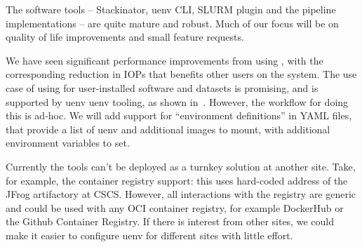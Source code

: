 The software tools -- Stackinator, uenv CLI, SLURM plugin and the pipeline implementations -- are quite mature and robust.
Much of our focus will be on quality of life improvements and small feature requests.

We have seen significant performance improvements from using \squashfs, with the corresponding reduction in IOPs that benefits other users on the system.
The use case of using \squashfs for user-installed software and datasets is promising, and is supported by uenv uenv tooling, as shown in~.
However, the workflow for doing this is ad-hoc.
We will add support for ``environment definitions'' in YAML files, that provide a list of uenv and additional \squashfs images to mount, with additional environment variables to set.

Currently the tools can't be deployed as a turnkey solution at another site.
Take, for example, the container registry support: this uses hard-coded address of the JFrog artifactory at CSCS.
However, all interactions with the registry are generic and could be used with any OCI container registry, for example DockerHub or the Github Container Registry.
If there is interest from other sites, we could make it easier to configure uenv for different sites with little effort.
